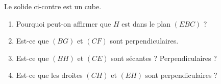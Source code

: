 
\begin{exercice}\label{exoSeconde-0087}

    \begin{minipage}{0.485\textwidth}
            Le solide ci-contre est un cube. 
        \begin{enumerate}
            \item
                Pourquoi peut-on affirmer que \( H\) est dans le plan \( (EBC)\) ?
            \item
                Est-ce que \( (BG)\) et \( (CF)\) sont perpendiculaires.
    \item
                Est-ce que \( (BH)\) et \( (CE)\) sont sécantes ? Perpendiculaires ?
    \item
        Est-ce que les droites \( (CH)\) et \( (EH)\) sont perpendiculaires ?
        \end{enumerate}
    \end{minipage}
    \vspace{1mm}
    \begin{minipage}{0.485\textwidth}
\begin{center}

\end{center}
    \end{minipage}


\end{exercice}
